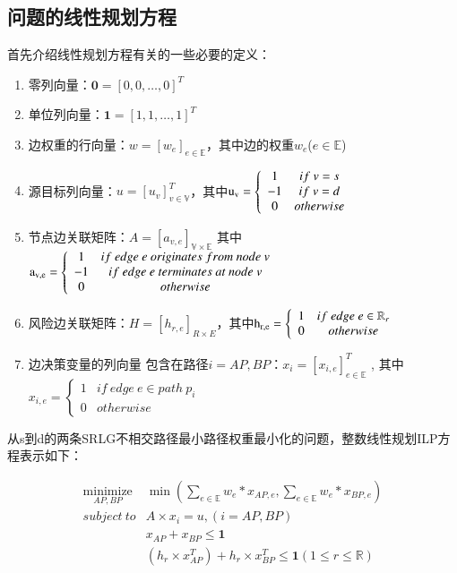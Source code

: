 \subsection{问题的线性规划方程}
首先介绍线性规划方程有关的一些必要的定义：
\begin{enumerate}
  \item 零列向量：$\textbf{0}=[0,0,\ldots,0]^T$
  \item 单位列向量：$\textbf{1}=[1,1,\ldots,1]^T$
  \item 边权重的行向量：$w=[w_e]_{e\in \mathbb{E}}$，其中边的权重$w_e$($e\in \mathbb{E}$)
  \item 源目标列向量：$u=[u_v]^T_{v\in \mathbb{V}}$，其中${\rm{u_v}} = \left\{ {\begin{array}{*{20}{c}} 1&{if\ v = s}\\{ - 1}&{if\ v = d}\\ 0&{otherwise} \end{array}} \right.$
  \item 节点边关联矩阵：$A=[a_{v,e}]_{\mathbb{V}\times \mathbb{E}}$ 其中 \\ ${\rm{a_{v,e}}} = \left\{ {\begin{array}{*{20}{c}} 1&{if\ edge\ e\ originates\ from\ node\ v}\\ { - 1}&{if\ edge\ e\ terminates\ at\ node\ v}\\ 0&{otherwise}
\end{array}} \right.$
  \item 风险边关联矩阵：$H=[h_{r,e}]_{R\times E}$，其中${\rm{h_{r,e}}} = \left\{ {\begin{array}{*{20}{c}} 1&{if\ edge\ e \in \mathbb{R}_r}\\ 0&{otherwise} \end{array}} \right.$
  \item  边决策变量的列向量 包含在路径$i=AP,BP$：$x_i=[x_{i,e}]^T_{e\in \mathbb{E}}$ , 其中\\${x_{i,e}} = \left\{ {\begin{array}{*{20}{c}} 1&{if\ edge\ e \in path\ p_i}\\0&{otherwise}\end{array}} \right.$
\end{enumerate}

从s到d的两条SRLG不相交路径最小路径权重最小化的问题，整数线性规划ILP方程表示如下：

\begin{equation}
\begin{array}{*{20}{c}}
   {\mathop {minimize}\limits_{AP,BP} } & {\min \left( {{\sum\limits_{e\in \mathbb{E}}w_e*x_{AP,e}},{\sum\limits_{e\in \mathbb{E}}w_e*x_{BP,e}}} \right)}\\
   {subject\ to} & A\times x_i=u,(i=AP,BP) \\
   {} & x_{AP}+x_{BP}\leq \textbf{1}\\
   {} & (h_{r}\times x_{AP}^T)+h_{r}\times x_{BP}^T \leq \textbf{1}(1\leq r \leq \mathbb{R})
\end{array}
\label{eq:problem definition}
\end{equation}



